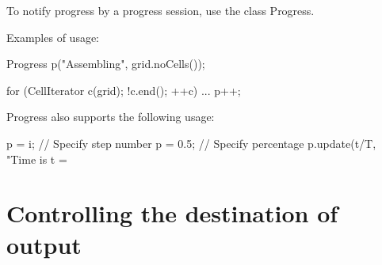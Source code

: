 To notify progress by a progress session, use the class
Progress.

Examples of usage:

\begin{code}
  Progress p("Assembling", grid.noCells());
  
  for (CellIterator c(grid); !c.end(); ++c) {
    ...
    p++;
  }
\end{code}

Progress also supports the following usage:

\begin{code}
  p = i;    // Specify step number
  p = 0.5;  // Specify percentage
  p.update(t/T, "Time is t = %
\end{code}

\section{Controlling the destination of output}

%
%
%
%



